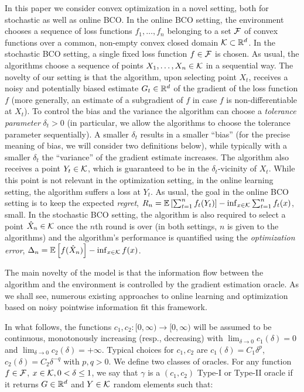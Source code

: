 In this paper we consider convex optimization in a novel setting, both for stochastic as well as online BCO.
In the online BCO setting, the environment chooses a sequence of loss functions $f_1,\dots,f_n$ belonging to a set $\mathcal{F}$ of convex functions over a common, non-empty convex closed domain $\mathcal{K}\subset \mathbb{R}^d$.
In the stochastic BCO setting, a single fixed loss function $f\in \mathcal{F}$ is chosen.
As usual, the algorithms choose a sequence of points $X_1,\dots,X_n\in \mathcal{K}$ in a sequential way.
The novelty of our setting is that the algorithm, upon selecting point $X_t$, receives
a noisy and potentially biased estimate $G_t\in \mathbb{R}^d$
of the gradient of the loss function $f$
(more generally, an estimate of a subgradient of $f$ in case $f$ is non-differentiable at $X_t$).
To control the bias and the variance the algorithm can choose a \emph{tolerance parameter} $\delta_t>0$
(in particular, we allow the algorithms to choose the tolerance parameter sequentially).
A smaller $\delta_t$ results in a smaller ``bias'' (for the precise meaning of bias, we will consider two definitions below), while typically with a smaller $\delta_t$ the ``variance'' of the gradient estimate increases.
The algorithm also receives a point $Y_t\in \mathcal{K}$, which is guaranteed to be in the $\delta_t$-vicinity of $X_t$.
While this point is not relevant in the optimization setting, in the online learning setting,
the algorithm suffers a loss at $Y_t$.
As usual, the goal in the online BCO setting is to keep the expected \emph{regret},
	$R_n =\mathbb{E}\left[ \sum_{t=1}^n f_t(Y_t)\right] - \inf_{x\in \mathcal{K}} \sum_{t=1}^n f_t(x)$,
small.
In the stochastic BCO setting, the algorithm is also required to select a point $\hat{X}_n\in \mathcal{K}$ once
the $n$th round is over (in both settings, $n$ is given to the algorithms)
and the algorithm's performance is quantified using the \emph{optimization error},
$\Delta_n = \mathbb{E}\left[f(\hat{X}_n)\right] - \inf_{x\in \mathcal{K}} f(x) $.

The main novelty of the model is that the information flow between the algorithm and the environment is controlled by the gradient estimation oracle. As we shall see, numerous existing approaches to online learning and optimization based on noisy pointwise information fit this framework.

In what follows, the functions $c_1,c_2:[0,\infty)\to [0,\infty)$ will be assumed to be continuous,
monotonously increasing (resp., decreasing) with
$\lim_{\delta\to  0} c_1(\delta)=0$ and $\lim_{\delta\to 0} c_2(\delta)=+\infty$.
Typical choices for $c_1,c_2$ are $c_1(\delta) = C_1 \delta^p$, $c_2(\delta) = C_2\delta^{-q}$ with $p,q>0$.
We define two classes of oracles. 
For any function $f\in \mathcal{F}$,
$x\in \mathcal{K},0<\delta\le 1$, we say that $\gamma$ is a  $(c_1,c_2)$ Type-I or Type-II oracle if it returns $G\in \mathbb{R}^d$ and  $Y\in \mathcal{K}$ random elements such that:

